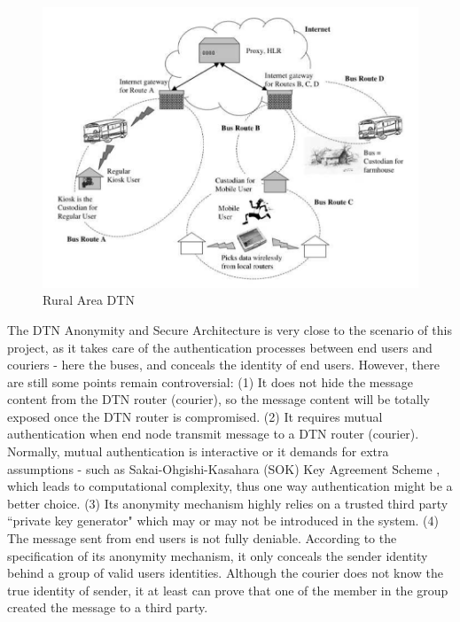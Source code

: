 \begin{figure}[h!]
\centering
\includegraphics[width=\textwidth,natwidth=913,natheight=682]{figures/ruralarea.png}
\caption{Rural Area DTN \cite{Seth}}
\label{fig:ruralarea}
\end{figure}

The DTN Anonymity and Secure Architecture is very close to the scenario of this project, as it takes care of the authentication processes between end users and couriers - here the buses, and conceals the identity of end users. However, there are still some points remain controversial: (1) It does not hide the message content from the DTN router (courier), so the message content will be totally exposed once the DTN router is compromised. (2) It requires mutual authentication when end node transmit message to a DTN router (courier). Normally, mutual authentication is interactive or it demands for extra assumptions - such as Sakai-Ohgishi-Kasahara (SOK) Key Agreement Scheme \cite{Sakai}, which leads to computational complexity, thus one way authentication might be a better choice. (3) Its anonymity mechanism highly relies on a trusted third party ``private key generator" which may or may not be introduced in the system. (4) The message sent from end users is not fully deniable. According to the specification of its anonymity mechanism, it only conceals the sender identity behind a group of valid users identities. Although the courier does not know the true identity of sender, it at least can prove that one of the member in the group created the message to a third party.
